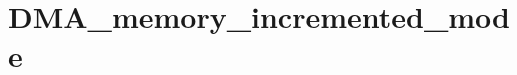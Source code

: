\hypertarget{group___d_m_a__memory__incremented__mode}{\section{D\-M\-A\-\_\-memory\-\_\-incremented\-\_\-mode}
\label{group___d_m_a__memory__incremented__mode}
}
